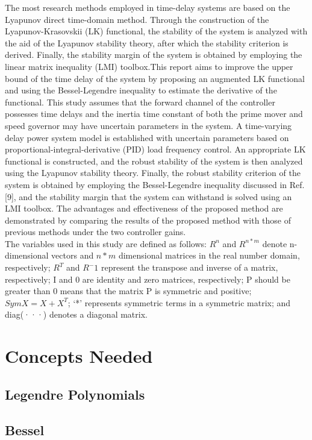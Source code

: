 \documentclass[journal]{IEEEtran}
\begin{document}
The most research methods employed in time-delay systems are based on the Lyapunov direct time-domain method. Through the construction of the Lyapunov-Krasovskii (LK) functional, the stability of the system is analyzed with the aid of the Lyapunov stability theory, after which the stability criterion is derived. Finally, the stability margin of the system is obtained by employing the linear matrix inequality (LMI) toolbox.This report aims to improve the upper bound of the time delay of the system by proposing an augmented LK functional and using the Bessel-Legendre inequality to estimate the derivative of the functional. This study assumes that the forward channel of the controller possesses time delays and the inertia time constant of both the prime mover and speed governor may have uncertain parameters in the system. A time-varying delay power system model is established with uncertain parameters based on proportional-integral-derivative (PID) load frequency control. An appropriate LK functional is constructed, and the robust stability of the system is then analyzed using the Lyapunov stability theory. Finally, the robust stability criterion of the system is obtained by employing the Bessel-Legendre inequality discussed in Ref. [9], and the stability margin that the system can withstand is solved using an LMI toolbox. The advantages and effectiveness of the proposed method are demonstrated by comparing the results of the proposed method with those of previous methods under the two controller gains.\\

The variables used in this study are defined as follows:
 $R^n$ and $R^{n*m}$ denote n-dimensional vectors and $n * m$ dimensional matrices in the real number domain, respectively; $R^T$ and $R^-1$ represent the transpose and inverse of a matrix, respectively; I and 0 are identity and zero matrices, respectively;  P  should be greater than 0 means that the matrix P is symmetric and positive; $Sym{X}=X+X^T$; ‘*’ represents symmetric terms in a symmetric matrix; and diag(···) denotes a diagonal matrix. \\

\newpage
\section{Concepts Needed}
\subsection{Legendre Polynomials}
\subsection{Bessel}
\end{document}
